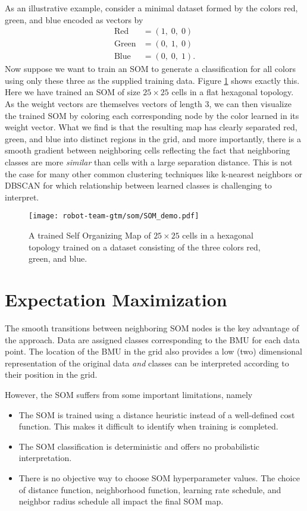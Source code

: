 As an illustrative example, consider a minimal dataset formed by the colors
red, green, and blue encoded as vectors by
\begin{align}
  \text{Red} &= \left(1,\; 0,\; 0 \right)\\
  \text{Green} &= \left(0,\; 1,\; 0 \right) \\
  \text{Blue} &= \left(0,\; 0,\; 1 \right).
\end{align}
Now suppose we want to train an SOM to generate a classification for all
colors using only these three as the supplied training data. Figure
\ref{fig:som-demo} shows exactly this. Here we have trained an SOM of size $25
\times 25$ cells in a flat hexagonal topology. As the weight vectors are
themselves vectors of length $3$, we can then visualize the trained SOM by
coloring each corresponding node by the color learned in its weight vector. What
we find is that the resulting map has clearly separated red, green, and blue
into distinct regions in the grid, and more importantly, there is a smooth
gradient between neighboring cells reflecting the fact that neighboring classes
are more \textit{similar} than cells with a large separation distance. This is
not the case for many other common clustering techniques like k-nearest
neighbors or DBSCAN for which relationship between learned classes is
challenging to interpret.

\begin{figure}[h!]
  \centering
  \texttt{[image: robot-team-gtm/som/SOM\_demo.pdf]}
  \caption{A trained Self Organizing Map of $25\times 25$ cells in a hexagonal topology trained on a dataset consisting of the three colors red, green, and blue.}
  \label{fig:som-demo}
\end{figure}


\section{Expectation Maximization}

The smooth transitions between neighboring SOM nodes is the key advantage of the
approach. Data are assigned classes corresponding to the BMU for each
data point. The location of the BMU in the grid also provides a low (two)
dimensional representation of the original data \textit{and} classes can be
interpreted according to their position in the grid.

However, the SOM suffers from some important limitations, namely
\begin{itemize}
  \item The SOM is trained using a distance heuristic instead of a well-defined
    cost function. This makes it difficult to identify when training is
    completed.
  \item The SOM classification is deterministic and offers no probabilistic
    interpretation.
  \item There is no objective way to choose SOM hyperparameter values. The choice of
    distance function, neighborhood function, learning rate schedule, and
    neighbor radius schedule all impact the final SOM map.
\end{itemize}

